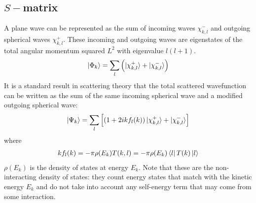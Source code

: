 \subsection{\(S-\)matrix}
A plane wave can be represented as the sum of incoming waves \(\chi^-_{k,l}\) and outgoing spherical waves \(\chi^+_{k,l}\). These incoming and outgoing waves are eigenstates of the total angular momentum squared \(L^2\) with eigenvalue \(l(l+1)\).
\begin{equation}\begin{aligned}
	\ket{\Phi_k} = \sum_l\left(\ket{\chi^+_{k,l}} + \ket{\chi^-_{k,l}}\right)
\end{aligned}\end{equation}
It is a standard result in scattering theory that the total scattered wavefunction can be written as the sum of the same incoming spherical wave and a modified outgoing spherical wave:
\begin{equation}\begin{aligned}
	\ket{\Psi_k} = \sum_l \left[\left(1 + 2i k f_l(k)\right)\ket{\chi^+_{k,l}} + \ket{\chi^-_{k,l}}\right]
\end{aligned}\end{equation}
where 
\begin{equation}\begin{aligned}
	k f_l(k) = -\pi \rho(E_k) T(k,l) = -\pi \rho(E_k) \bra{l}T(k)\ket{l}
\end{aligned}\end{equation}
\(\rho(E_k)\) is the density of states at energy \(E_k\). Note that these are the non-interacting density of states: they count energy states that match with the kinetic energy \(E_k\) and do not take into account any self-energy term that may come from some interaction.

